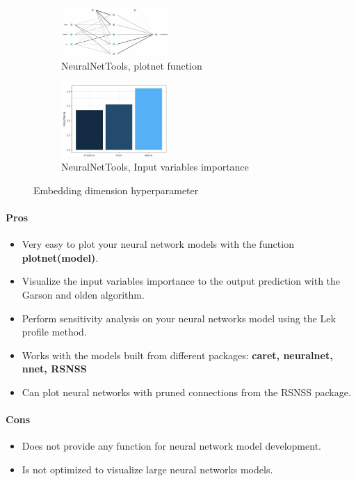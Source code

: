\documentclass[letter,8pt]{article}\usepackage[]{graphicx}\usepackage[]{color}
\begin{document}
\begin{figure}[H]
  \begin{subfigure}{0.5\textwidth}
    \centering\includegraphics[width=0.45\textwidth]{figure/plotnet.png}
    \caption{NeuralNetTools, plotnet function}
  \end{subfigure}
  \begin{subfigure}{0.5\textwidth}
    \centering\includegraphics[width=0.45\textwidth]{figure/garson_algorithm.png}
    \caption{NeuralNetTools, Input variables importance}
  \end{subfigure}
    \caption{Embedding dimension hyperparameter \cite{Ciaburro2017NeuralNW}}
\end{figure}

\paragraph{Pros}
\begin{itemize}
\item Very easy to plot your neural network models with the function \textbf{plotnet(model)}.
\item Visualize the input variables importance to the output prediction with the Garson and olden algorithm.
\item Perform sensitivity analysis on your neural networks model using the Lek profile method.
\item Works with the models built from different packages: \textbf{caret, neuralnet, nnet, RSNSS}
\item Can plot neural networks with pruned connections from the RSNSS package.
\end{itemize}

\paragraph{Cons}
\begin{itemize}
\item Does not provide any function for neural network model development.
\item Is not optimized to visualize large neural networks models.
\end{itemize}
\end{document}
